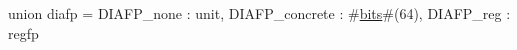 union diafp = {
  DIAFP_none : unit,
  DIAFP_concrete : #\hyperref[sailRISCVzbits]{bits}#(64),
  DIAFP_reg : regfp
}
